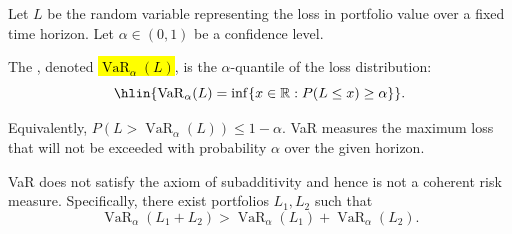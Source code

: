 \begin{definition} \label{definition:value_at_risk_VaR_for_a_portfolio_loss_distribution}
Let $L$ be the random variable representing the loss in portfolio value over a fixed time horizon. Let $\alpha \in (0, 1)$ be a confidence level.

The , denoted \hl{$\operatorname{VaR}_\alpha(L)$}, is the $\alpha$-quantile of the loss distribution:
$$\hlin{\operatorname{VaR}_\alpha(L) = \inf\{x \in \mathbb{R} : P(L \leq x) \geq \alpha\}}.$$

Equivalently, $P(L > \operatorname{VaR}_\alpha(L)) \leq 1 - \alpha$. VaR measures the maximum loss that will not be exceeded with probability $\alpha$ over the given horizon.

VaR does not satisfy the axiom of subadditivity and hence is not a coherent risk measure. Specifically, there exist portfolios $L_1, L_2$ such that
$$\operatorname{VaR}_\alpha(L_1 + L_2) > \operatorname{VaR}_\alpha(L_1) + \operatorname{VaR}_\alpha(L_2).$$
\end{definition}